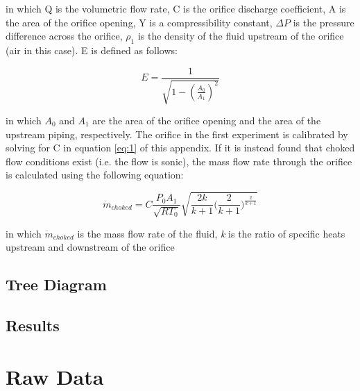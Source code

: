 \documentclass[paper=letter, fontsize=10pt]{scrartcl} %
\begin{document}
\begin{appendices}
in which Q is the volumetric flow rate, C is the orifice discharge coefficient, A is the area of the orifice opening, Y is a compressibility constant, \(\Delta P\) is the pressure difference across the orifice, \(\rho_1\) is the density of the fluid upstream of the orifice (air in this case).  E is defined as follows:

\begin{equation}\label{eq:2}
E =  \frac{1}{\sqrt{1 - (\frac{A_0}{A_1})^2}}
\end{equation}

in which \(A_0\) and \(A_1\) are the area of the orifice opening and the area of the upstream piping, respectively.  The orifice in the first experiment is calibrated by solving for C in equation \ref{eq:1} of this appendix.  If it is instead found that choked flow conditions exist (i.e. the flow is sonic), the mass flow rate through the orifice is calculated using the following equation:

\begin{equation}\label{eq:3}
\dot{m}_{choked} = C \frac{P_0 A_1}{\sqrt{R T_0}}\sqrt{\frac{2k}{k+1}\Bigg(\frac{2}{k+1}\Bigg)^\frac{2}{k+1}}
\end{equation}

in which \(\dot{m}_{choked}\) is the mass flow rate of the fluid, \textit{k} is the ratio of specific heats upstream and downstream of the orifice%


\subsection{Tree Diagram}

\subsection{Results}

\clearpage
\section{Raw Data}

\end{appendices}
\end{document}
